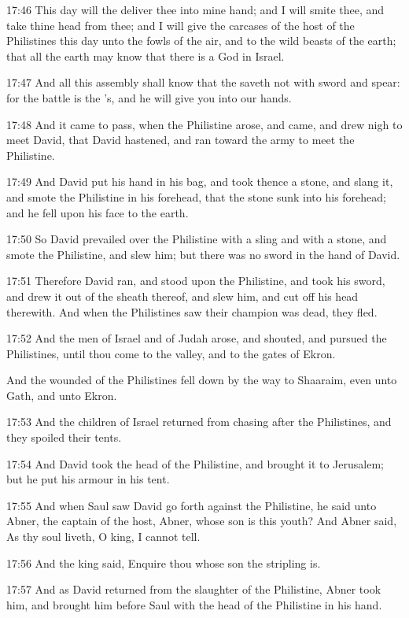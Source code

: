 17:46 This day will the \LORD deliver thee into mine hand; and I will
smite thee, and take thine head from thee; and I will give the
carcases of the host of the Philistines this day unto the fowls of the
air, and to the wild beasts of the earth; that all the earth may know
that there is a God in Israel.

17:47 And all this assembly shall know that the \LORD saveth not with
sword and spear: for the battle is the \LORD's, and he will give you
into our hands.

17:48 And it came to pass, when the Philistine arose, and came, and
drew nigh to meet David, that David hastened, and ran toward the army
to meet the Philistine.

17:49 And David put his hand in his bag, and took thence a stone, and
slang it, and smote the Philistine in his forehead, that the stone
sunk into his forehead; and he fell upon his face to the earth.

17:50 So David prevailed over the Philistine with a sling and with a
stone, and smote the Philistine, and slew him; but there was no sword
in the hand of David.

17:51 Therefore David ran, and stood upon the Philistine, and took his
sword, and drew it out of the sheath thereof, and slew him, and cut
off his head therewith. And when the Philistines saw their champion
was dead, they fled.

17:52 And the men of Israel and of Judah arose, and shouted, and
pursued the Philistines, until thou come to the valley, and to the
gates of Ekron.

And the wounded of the Philistines fell down by the way to Shaaraim,
even unto Gath, and unto Ekron.

17:53 And the children of Israel returned from chasing after the
Philistines, and they spoiled their tents.

17:54 And David took the head of the Philistine, and brought it to
Jerusalem; but he put his armour in his tent.

17:55 And when Saul saw David go forth against the Philistine, he said
unto Abner, the captain of the host, Abner, whose son is this youth?
And Abner said, As thy soul liveth, O king, I cannot tell.

17:56 And the king said, Enquire thou whose son the stripling is.

17:57 And as David returned from the slaughter of the Philistine,
Abner took him, and brought him before Saul with the head of the
Philistine in his hand.


